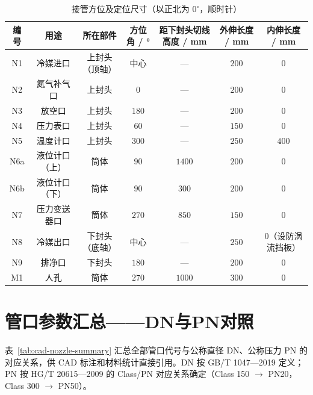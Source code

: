 \begin{table}[htbp]
  \centering
  \caption{接管方位及定位尺寸（以正北为 $0^\circ$，顺时针）}
  \label{tab:cad-orientation-detail}
  \small\renewcommand{\arraystretch}{1.2}
  \setlength{\tabcolsep}{3pt}
  \begin{tabularx}{\textwidth}{@{}c c c c c c c@{}}
    \toprule
    \textbf{编号} & \textbf{用途} & \textbf{所在部件} & \textbf{方位角 / °} & \textbf{距下封头切线高度 / mm} & \textbf{外伸长度 / mm} & \textbf{内伸长度 / mm} \\
    \midrule
    N1  & 冷媒进口            & 上封头（顶轴）  & 中心     & —                       & $200$ & $0$ \\
    N2  & 氮气补气口          & 上封头          & $0$      & —                       & $200$ & $0$ \\
    N3  & 放空口              & 上封头          & $180$    & —                       & $200$ & $0$ \\
    N4  & 压力表口            & 上封头          & $60$     & —                       & $150$ & $0$ \\
    N5  & 温度计口            & 上封头          & $300$    & —                       & $250$ & $400$ \\
    N6a & 液位计口（上）      & 筒体            & $90$     & $1400$                  & $200$ & $0$ \\
    N6b & 液位计口（下）      & 筒体            & $90$     & $300$                   & $200$ & $0$ \\
    N7  & 压力变送器口        & 筒体            & $270$    & $850$                   & $150$ & $0$ \\
    N8  & 冷媒出口            & 下封头（底轴）  & 中心     & —                       & $250$ & $0$（设防涡流挡板） \\
    N9  & 排净口              & 下封头          & $180$    & —                       & $200$ & $0$ \\
    M1  & 人孔                & 筒体            & $270$    & $1000$                  & $300$ & $0$ \\
    \bottomrule
  \end{tabularx}
\end{table}

\section{管口参数汇总——DN与PN对照}
\label{sec:cad-nozzle-dn-pn}

表~\ref{tab:cad-nozzle-summary} 汇总全部管口代号与公称直径 DN、公称压力 PN 的对应关系，供 CAD 标注和材料统计直接引用。DN 按 GB/T 1047—2019 定义；PN 按 HG/T 20615—2009 的 Class/PN 对应关系确定（Class 150 $\rightarrow$ PN20，Class 300 $\rightarrow$ PN50）。

